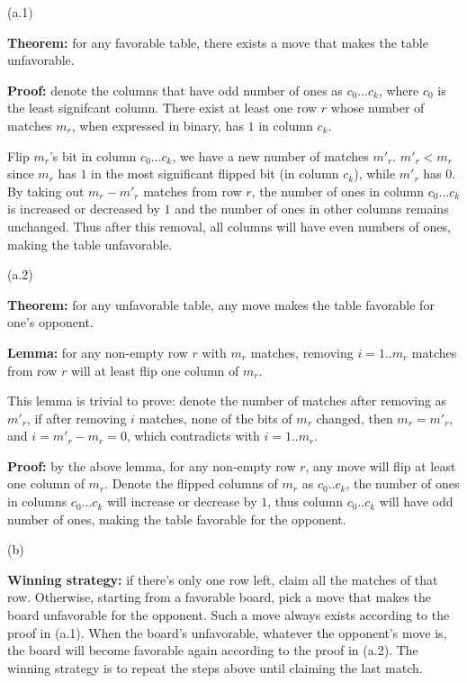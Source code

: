 \documentclass{article}
\begin{document}
\begin{description}
  (a.1) 

  \textbf{Theorem:} for any favorable table, there exists a move that makes the table unfavorable.

  \textbf{Proof:} denote the columns that have odd number of ones as $c_0...c_k$, where $c_0$ is the least signifcant column. There exist at least one row $r$ whose number of matches $m_r$, when expressed in binary, has $1$ in column $c_k$.

  Flip $m_r$'s bit in column $c_0...c_k$, we have a new number of matches $m'_r$. $m'_r < m_r$ since $m_r$ has $1$ in the most significant flipped bit (in column $c_k$), while $m'_r$ has $0$. By taking out $m_r - m'_r$ matches from row $r$, the number of ones in column $c_0...c_k$ is increased or decreased by $1$ and the number of ones in other columns remains unchanged. Thus after this removal, all columns will have even numbers of ones, making the table unfavorable.

  (a.2) 

  \textbf{Theorem:} for any unfavorable table, any move makes the table favorable for one’s opponent.

  \textbf{Lemma:} for any non-empty row $r$ with $m_r$ matches, removing $i=1..m_r$ matches from row $r$ will at least flip one column of $m_r$. 

  This lemma is trivial to prove: denote the number of matches after removing as $m'_r$, if after removing $i$ matches, none of the bits of $m_r$ changed, then $m_r = m'_r$, and $i = m'_r - m_r = 0$, which contradicts with $i=1..m_r$.

  \textbf{Proof:} by the above lemma, for any non-empty row $r$, any move will flip at least one column of $m_r$. Denote the flipped columns of $m_r$ as $c_0..c_k$, the number of ones in columns $c_0...c_k$ will increase or decrease by $1$, thus column $c_0..c_k$ will have odd number of ones, making the table favorable for the opponent.

  (b) 

  \textbf{Winning strategy:} if there's only one row left, claim all the matches of that row. Otherwise, starting from a favorable board, pick a move that makes the board unfavorable for the opponent. Such a move always exists according to the proof in (a.1). When the board's unfavorable, whatever the opponent's move is, the board will become favorable again according to the proof in (a.2). The winning strategy is to repeat the steps above until claiming the last match.

\end{description}
\end{document}
